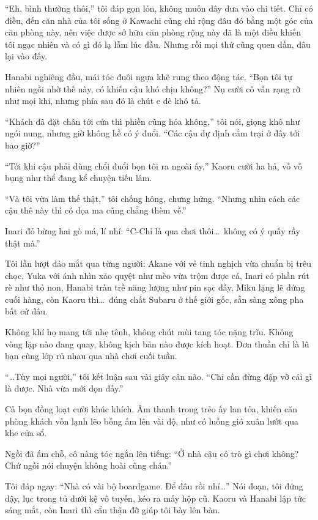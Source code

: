 \documentclass[../main.tex]{subfiles}
\begin{document}
``Eh, bình thường thôi,'' tôi đáp gọn lỏn, không muốn dây dưa vào chi tiết. Chỉ có điều, đến căn nhà của tôi sống ở Kawachi cũng chỉ rộng đâu đó bằng một góc của căn phòng này, nên việc được sở hữu căn phòng rộng này đã là một điều khiến tôi ngạc nhiên và có gì đó lạ lẫm lúc đầu. Nhưng rồi mọi thứ cũng quen dần, đâu lại vào đấy.

Hanabi nghiêng đầu, mái tóc đuôi ngựa khẽ rung theo động tác. ``Bọn tôi tự nhiên ngồi nhờ thế này, có khiến cậu khó chịu không?'' Nụ cười cô vẫn rạng rỡ như mọi khi, nhưng phía sau đó là chút e dè khó tả.

``Khách đã đặt chân tới cửa thì phiền cũng hóa không,'' tôi nói, giọng khô như ngói nung, nhưng giờ không hề có ý đuổi. ``Các cậu dự định cắm trại ở đây tới bao giờ?''

``Tới khi cậu phải dùng chổi đuổi bọn tôi ra ngoài ấy,'' Kaoru cười ha hả, vỗ vỗ bụng như thể đang kể chuyện tiếu lâm.

``Và tôi vừa làm thế thật,'' tôi chống hông, chưng hửng. ``Nhưng nhìn cách các cậu thê này thì có dọa ma cũng chẳng thèm về.''

Inari đỏ bừng hai gò má, lí nhí: ``C-Chỉ là qua chơi thôi\dots\ không có ý quấy rầy thật mà.''

Tôi lần lượt đảo mắt qua từng người: Akane với vẻ tinh nghịch vừa chuẩn bị trêu chọc, Yuka với ánh nhìn xảo quyệt như mèo vừa trộm được cá, Inari có phần rút rè như thỏ non, Hanabi tràn trề năng lượng như pin sạc đầy, Miku lặng lẽ đứng cuối hàng, còn Kaoru thì\dots\ đúng chất Subaru ở thế giới gốc, sẵn sàng xông pha bất cứ đâu.

Không khí họ mang tới nhẹ tênh, không chút mùi tang tóc nặng trĩu. Không vòng lặp nào đang quay, không kịch bản nào được kích hoạt. Đơn thuần chỉ là lũ bạn cùng lớp rủ nhau qua nhà chơi cuối tuần.

``\dots Tùy mọi người,'' tôi kết luận sau vài giây cân não. ``Chỉ cần đừng đập vỡ cái gì là được. Nhà vừa mới dọn đấy.''

Cả bọn đồng loạt cười khúc khích. Âm thanh trong trẻo ấy lan tỏa, khiến căn phòng khách vốn lạnh lẽo bỗng ấm lên vài độ, như có luồng gió xuân lướt qua khe cửa sổ.

Ngồi đã ấm chỗ, cô nàng tóc ngắn lên tiếng: ``Ở nhà cậu có trò gì chơi không? Chứ ngồi nói chuyện không hoài cũng chán.''

Tôi đáp ngay: ``Nhà có vài bộ boardgame. Để đâu rồi nhỉ\dots'' Nói đoạn, tôi đứng dậy, lục trong tủ dưới kệ vô tuyến, kéo ra mấy hộp cũ. Kaoru và Hanabi lập tức sáng mắt, còn Inari thì cẩn thận đỡ giúp tôi bày lên bàn.
\end{document}
